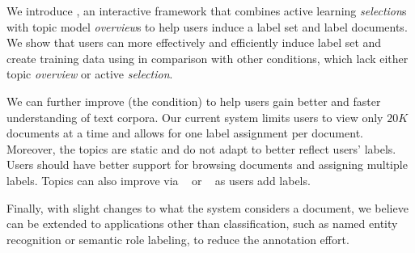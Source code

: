 









We introduce \name{}, an interactive framework that combines active
learning \emph{selection}s with topic model \emph{overview}s to help
users induce a label set and label documents. We show that users can
more effectively and efficiently induce label set and create training
data using \name{} in comparison with other conditions, which lack
either topic \emph{overview} or active \emph{selection}.

We can further improve \name{} (the  condition) to help users gain
better and faster understanding of text corpora.  Our current system limits
users to view only $20K$ documents at a time and allows for one label assignment
per document. Moreover, the topics are static and do not adapt to better reflect
users' labels. Users should have better support for browsing documents and
assigning multiple labels.  Topics can also improve
via ~\cite{blei-07b} or
~\cite{ramage2009labeled} as users add labels.

Finally, with slight changes to what the system
considers a document, we believe \name{} can be extended to  applications
other than classification, such as named entity recognition or
semantic role labeling, to reduce the annotation effort.
